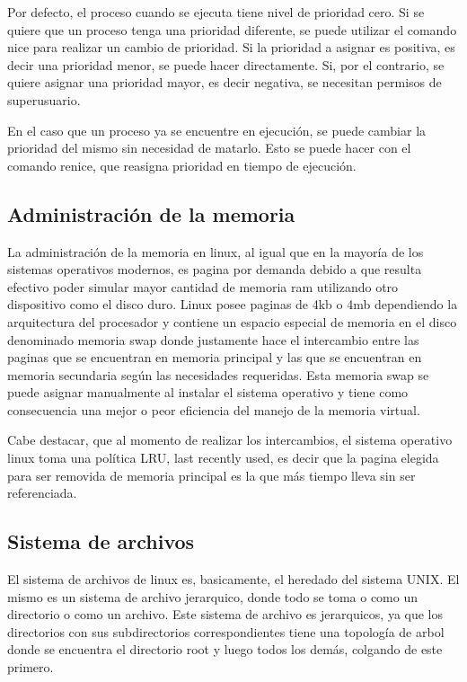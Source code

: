 \documentclass[a4paper, 12pt]{article}
\begin{document}
Por defecto, el proceso cuando se ejecuta tiene nivel de prioridad cero. Si se quiere que un proceso tenga una prioridad diferente, se puede utilizar el comando nice para realizar un cambio de prioridad. Si la prioridad a asignar es positiva, es decir una prioridad menor, se puede hacer directamente. Si, por el contrario, se quiere asignar una prioridad mayor, es decir negativa, se necesitan permisos de superusuario.

En el caso que un proceso ya se encuentre en ejecuci\'on, se puede cambiar la prioridad del mismo sin necesidad de matarlo. Esto se puede hacer con el comando renice, que reasigna prioridad en tiempo de ejecuci\'on.

\subsection*{Administraci\'on de la memoria}

La administraci\'on de la memoria en linux, al igual que en la mayor\'ia de los sistemas operativos modernos, es pagina por demanda debido a que resulta efectivo poder simular mayor cantidad de memoria ram utilizando otro dispositivo como el disco duro. Linux posee paginas de 4kb o 4mb dependiendo la arquitectura del procesador y contiene un espacio especial de memoria en el disco denominado memoria swap donde justamente hace el intercambio entre las paginas que se encuentran en memoria principal y las que se encuentran en memoria secundaria seg\'un las necesidades requeridas. Esta memoria swap se puede asignar manualmente al instalar el sistema operativo y tiene como consecuencia una mejor o peor eficiencia del manejo de la memoria virtual. 

Cabe destacar, que al momento de realizar los intercambios, el sistema operativo linux toma una pol\'itica LRU, last recently used, es decir que la pagina elegida para ser removida de memoria principal es la que m\'as tiempo lleva sin ser referenciada.

\subsection*{Sistema de archivos}

El sistema de archivos de linux es, basicamente, el heredado del sistema UNIX. El mismo es un sistema de archivo jerarquico, donde todo se toma o como un directorio o como un archivo. Este sistema de archivo es jerarquicos, ya que los directorios con sus subdirectorios correspondientes tiene una topolog\'ia de arbol donde se encuentra el directorio root y luego todos los dem\'as, colgando de este primero. 
\end{document}
